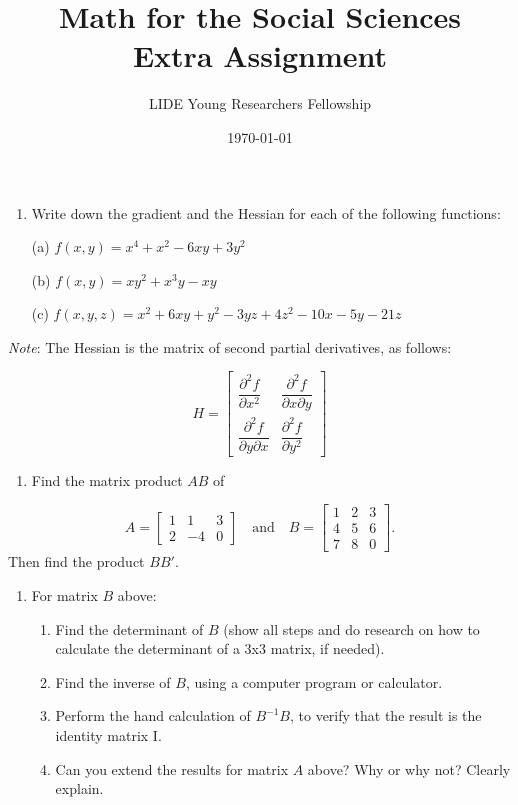 \documentclass{article}
\title{Math for the Social Sciences \\[1em] \large Extra Assignment}
\date{\today}
\author{LIDE Young Researchers Fellowship}
\begin{document}
\maketitle

\begin{enumerate}
\item Write down the gradient and the Hessian for each of the following functions:
\end{enumerate}

\begin{itemize}
    \item[(a)] $f(x, y) = x^4 + x^2 - 6xy + 3y^2$
    \item[(b)] $f(x, y) = xy^2 + x^3y - xy$
    \item[(c)] $f(x, y, z) = x^2 + 6xy + y^2 - 3yz + 4z^2 - 10x - 5y - 21z$
\end{itemize}

\textit{Note}: The Hessian is the matrix of second partial derivatives, as follows:

\[
H = \begin{bmatrix}
    \dfrac{\partial^2 f}{\partial x^2} & \dfrac{\partial^2 f}{\partial x \partial y} \\
    \dfrac{\partial^2 f}{\partial y \partial x} & \dfrac{\partial^2 f}{\partial y^2}
\end{bmatrix}
\]


\begin{enumerate}[resume]
    \item Find the matrix product $AB$ of
\end{enumerate}
    \[
A = \begin{bmatrix} 1 & 1 & 3 \\ 2 & -4 & 0 \end{bmatrix} \quad \text{and} \quad B = \begin{bmatrix} 1 & 2 & 3 \\ 4 & 5 & 6 \\ 7 & 8 & 0 \end{bmatrix}.
\]
Then find the product $BB'$.

\begin{enumerate}[resume]
    \item For matrix $B$ above:
    \begin{enumerate}
        \item Find the determinant of $B$ (show all steps and do research on how to calculate the determinant of a 3x3 matrix, if needed).
        \item Find the inverse of $B$, using a computer program or calculator.
        \item Perform the hand calculation of $B^{-1}B$, to verify that the result is the identity matrix I.
        \item Can you extend the results for matrix $A$ above? Why or why not? Clearly explain.
    \end{enumerate}
\end{enumerate}
\end{document}
